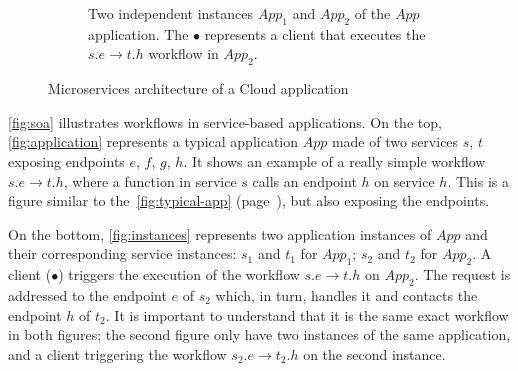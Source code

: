 \begin{figure}[htbp]
\begin{subfigure}[b]{.7\textwidth}
{
    }
    \caption{Two independent instances $App_1$ and $App_2$ of the
      $App$ application. The $\bullet$ represents a client that
      executes the $s.e \rightarrow t.h$ workflow in $App_2$.}
    \label{fig:instances}
  \end{subfigure}
  \caption{Microservices architecture of a Cloud application}
  \label{fig:soa}
\end{figure}

\autoref{fig:soa} illustrates workflows in service-based applications.
%
%
On the top, \autoref{fig:application} represents a typical application
$App$ made of two services $s$, $t$ exposing endpoints $e$, $f$, $g$,
$h$.
%
It shows an example of a really simple workflow $s.e \rightarrow t.h$,
where a function in service $s$ calls an endpoint $h$ on service
$h$.
%
This is a figure similar to the~\autoref{fig:typical-app}
(page~\pageref{fig:typical-app}), but also exposing the endpoints.
%

On the bottom, \autoref{fig:instances} represents two application
instances of $App$ and their corresponding service instances: $s_1$
and $t_1$ for $App_1$; $s_2$ and $t_2$ for $App_2$.
%
A client ($\bullet$) triggers the execution of the workflow
$s.e \rightarrow t.h$ on $App_2$.
%
The request is addressed to the endpoint $e$ of $s_2$ which, in turn,
handles it and contacts the endpoint $h$ of $t_2$.
%
It is important to understand that it is the same exact workflow in
both figures; the second figure only have two instances of the same
application, and a client triggering the workflow
$s_2.e \rightarrow t_2.h$ on the second instance.


